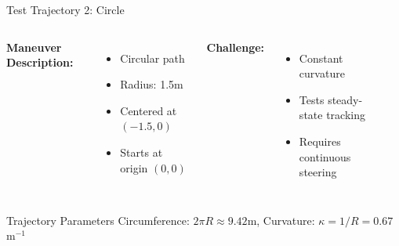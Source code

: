 \documentclass[10pt]{beamer}
\begin{document}
\begin{frame}{Test Trajectory 2: Circle}
  \begin{columns}[c]
    \textbf{Maneuver Description:}
    \begin{itemize}
      \item Circular path
      \item Radius: 1.5m
      \item Centered at $(-1.5, 0)$
      \item Starts at origin $(0, 0)$
    \end{itemize}

    \vspace{0.3cm}

    \textbf{Challenge:}
    \begin{itemize}
      \item Constant curvature
      \item Tests steady-state tracking
      \item Requires continuous steering
    \end{itemize}

    \begin{center}
    \end{center}
  \end{columns}

  \vspace{0.3cm}

  \begin{block}{Trajectory Parameters}
    Circumference: $2\pi R \approx 9.42$m, Curvature: $\kappa = 1/R = 0.67$ m$^{-1}$
  \end{block}
\end{frame}

\end{document}
